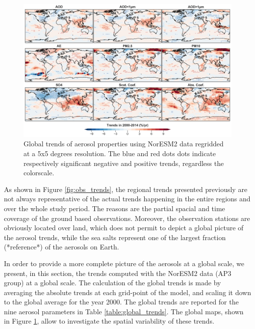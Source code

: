 \documentclass[journal abbreviation, manuscript]{copernicus}
\begin{document}
\begin{figure}[t]
 \includegraphics[width=16cm]{../scripts/figs/trends_map2.png}
 \caption{Global trends of aerosol properties using NorESM2 data regridded at a 5x5 degrees resolution. The blue and red dots dots indicate respectively significant negative and positive trends, regardless the colorscale.}
 \label{fig:global_trends}
\end{figure}

As shown in Figure \ref{fig:obs_trends}, the regional trends presented previously are not always representative of the actual trends happening in the entire regions and over the whole study period. The reasons are the partial spacial and time coverage of the ground based observations. Moreover, the observation stations are obviously located over land, which does not permit to depict a global picture of the aerosol trends, while the sea salts represent one of the largest fraction (*reference*) of the aerosols on Earth.

In order to provide a more complete picture of the aerosols at a global scale, we present, in this section, the trends computed with the NorESM2 data (AP3 group) at a global scale. The calculation of the global trends is made by averaging the absolute trends at each grid-point of the model, and scaling it down to the global average for the year 2000. The global trends are reported for the nine aerosol parameters in Table \ref{table:global_trends}. The global maps, shown in Figure \ref{fig:global_trends}, allow to investigate the spatial variability of these trends.
\end{document}
